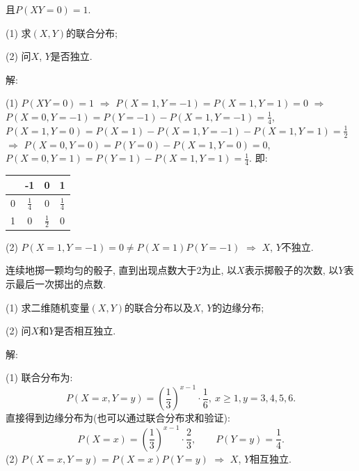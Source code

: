 \documentclass[standard]{ExBook}
\renewenvironment{shaded}{%
  \def\FrameCommand{\fboxsep=\FrameSep \colorbox{shadecolor}}%
  \MakeFramed{\advance\hsize-\width \FrameRestore}%
}{%
  \endMakeFramed
}
\begin{document}
\begin{qitems}
\begin{bbox}
\begin{shaded}
且$P(XY=0)=1$.

(1) 求$(X,Y)$的联合分布;

(2) 问$X$, $Y$是否独立.
    \end{shaded}
    \end{bbox}

\vspace{\dimexpr2.5cm-5em\relax}

解: 

(1) $P(XY=0)=1$ $\Longrightarrow$ $P(X=1,Y=-1)=P(X=1,Y=1)=0$ $\Longrightarrow$ $P(X=0,Y=-1)=P(Y=-1)-P(X=1,Y=-1)=\frac{1}{4}$, $P(X=1,Y=0)=P(X=1)-P(X=1,Y=-1)-P(X=1,Y=1)=\frac{1}{2}$ $\Longrightarrow$ $P(X=0,Y=0)=P(Y=0)-P(X=1,Y=0)=0$, $P(X=0,Y=1)=P(Y=1)-P(X=1,Y=1)=\frac{1}{4}$. 即:

\begin{center}
    \renewcommand{\arraystretch}{1.4}
    \setlength{\tabcolsep}{20pt}
    \begin{tabular}{c|c|c|c}
	    \hline
	    \diagbox{$X$}{$P(X,Y)$}{$Y$} & -1 & 0 & 1\\
	    \hline
	    0 & $\displaystyle\frac{1}{4}$ & 0 & $\displaystyle\frac{1}{4}$\\
	    \hline
	    1 & 0 & $\displaystyle\frac{1}{2}$ & 0\\
	    \hline
    \end{tabular}
\end{center}
(2) $P(X=1,Y=-1)=0\neq P(X=1)P(Y=-1)$ $\Longrightarrow$ $X$, $Y$不独立.

\vspace{2.5cm-5em}

    \begin{bbox}
    \begin{shaded}
        \qitem
连续地掷一颗均匀的骰子, 直到出现点数大于2为止, 以$X$表示掷骰子的次数, 以$Y$表示最后一次掷出的点数.

(1) 求二维随机变量$(X,Y)$的联合分布以及$X$, $Y$的边缘分布;

(2) 问$X$和$Y$是否相互独立.
    \end{shaded}
    \end{bbox}

\vspace{\dimexpr2.5cm-5em\relax}

解: 

(1) 联合分布为:
$$P(X=x,Y=y)=\left(\frac{1}{3}\right)^{x-1}\cdot\frac{1}{6},\ x\geq1,y=3,4,5,6.$$
直接得到边缘分布为(也可以通过联合分布求和验证):
$$P(X=x)=\left(\frac{1}{3}\right)^{x-1}\cdot\frac{2}{3},\qquad P(Y=y)=\frac{1}{4}.$$
(2) $P(X=x,Y=y)=P(X=x)P(Y=y)$ $\Longrightarrow$ $X$, $Y$相互独立.


\end{qitems}
\end{document}
